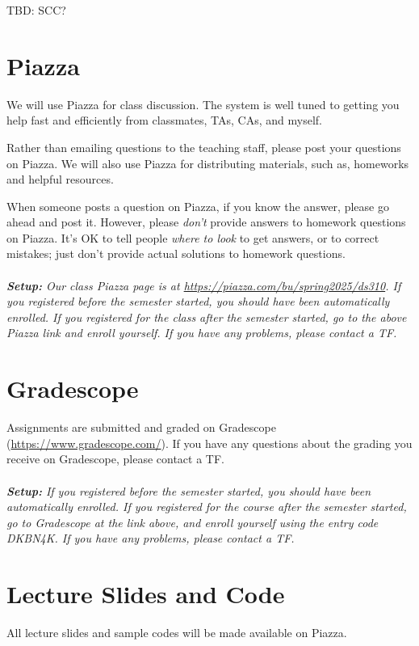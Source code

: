\documentclass[11pt]{article}
\begin{document}
TBD: SCC?

\section*{Piazza}

We will use Piazza for class discussion. The system is well
tuned to getting you help fast and efficiently from classmates, TAs,
CAs, and myself. 

Rather than emailing questions to the teaching staff, please post your questions on Piazza.  
We will also use Piazza for distributing materials, such as, homeworks and helpful resources.

When someone posts a question on Piazza, if you know the answer, please
go ahead and post it. However, please \emph{don't} provide answers to homework
questions on Piazza. It's OK to tell people \emph{where to look} to
get answers, or to correct mistakes;  just don't provide actual solutions
to homework questions.
\\
~\\\emph{\textbf{Setup:} Our class Piazza
page is at \url{https://piazza.com/bu/spring2025/ds310}.  If you
registered before the semester started, you should have been automatically enrolled. If you registered for the class after the semester started, go to the above Piazza link and enroll yourself. If you have any problems, please contact a TF.}

\section*{Gradescope}

Assignments are submitted and graded on Gradescope
(\url{https://www.gradescope.com/}). If you have any questions
about the grading you receive on Gradescope, please contact a TF.
\\
~\\\emph{\textbf{Setup:} If you registered before the semester started, you should have been automatically enrolled. If you registered for the course after the semester started, go to Gradescope at the link above, and enroll yourself using the entry code DKBN4K. If you have any problems, please contact a TF.}


\section*{Lecture Slides and Code} 
All lecture slides and sample codes will be made available on Piazza.
\end{document}
